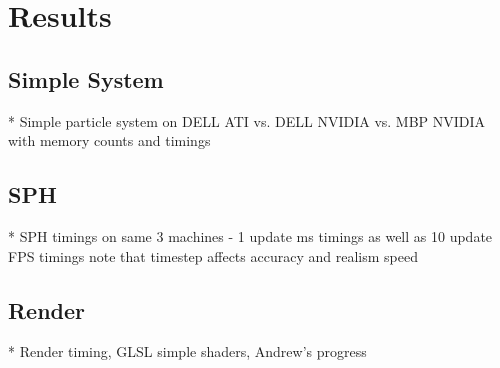 \chapter{Results}
\section{Simple System}
* Simple particle system on DELL ATI vs. DELL NVIDIA vs. MBP NVIDIA
    with memory counts and timings

\section{SPH}
* SPH timings on same 3 machines - 1 update ms timings 
    as well as 10 update FPS timings
    note that timestep affects accuracy and realism speed

\section{Render}
* Render timing, GLSL simple shaders, Andrew's progress 


